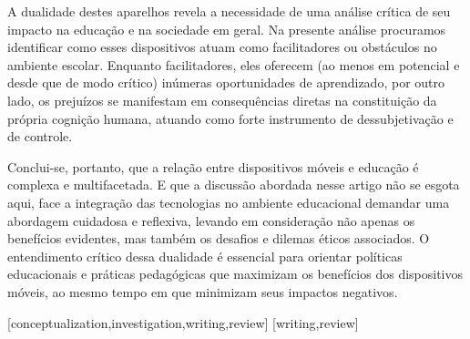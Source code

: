 \documentclass[portuguese]{textolivre}
\begin{document}
A dualidade destes aparelhos revela a necessidade de uma análise crítica de seu impacto na educação e na sociedade em geral. Na presente análise procuramos identificar como esses dispositivos atuam como facilitadores ou obstáculos no ambiente escolar. Enquanto facilitadores, eles oferecem (ao menos em potencial e desde que de modo crítico) inúmeras oportunidades de aprendizado, por outro lado, os prejuízos se manifestam em consequências diretas na constituição da própria cognição humana, atuando como forte instrumento de dessubjetivação e de controle.

Conclui-se, portanto, que a relação entre dispositivos móveis e educação é complexa e multifacetada. E que a discussão abordada nesse artigo não se esgota aqui, face a integração das tecnologias no ambiente educacional demandar uma abordagem cuidadosa e reflexiva, levando em consideração não apenas os benefícios evidentes, mas também os desafios e dilemas éticos associados. O entendimento crítico dessa dualidade é essencial para orientar políticas educacionais e práticas pedagógicas que maximizam os benefícios dos dispositivos móveis, ao mesmo tempo em que minimizam seus impactos negativos.

\printbibliography\label{sec-bib}
\begin{contributors}
[conceptualization,investigation,writing,review]
[writing,review]
\end{contributors}
\end{document}
